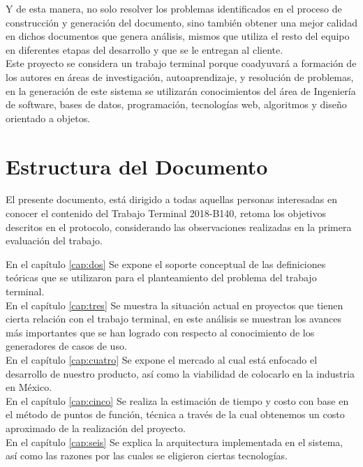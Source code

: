 Y de esta manera, no solo resolver los problemas identificados en el proceso de construcción y generación del documento, sino también obtener una mejor calidad en dichos documentos que genera análisis, mismos que utiliza el resto del equipo en diferentes etapas del desarrollo y que se le entregan al cliente.\\

Este proyecto se considera un trabajo terminal porque coadyuvará a formación de los autores en áreas de investigación, autoaprendizaje, y resolución de problemas, en la generación de este sistema se utilizarán conocimientos del área de Ingeniería de software, bases de datos, programación, tecnologías web, algoritmos y diseño orientado a objetos.

\section{Estructura del Documento}

El presente documento, está dirigido a todas aquellas personas interesadas en conocer el contenido del Trabajo Terminal 2018-B140, retoma los objetivos descritos en el protocolo, considerando las observaciones realizadas en la primera evaluación del trabajo. 


En el capítulo  \ref{cap:dos} Se expone el soporte conceptual de las definiciones teóricas que se utilizaron para el planteamiento del problema del trabajo terminal. \\

En el capítulo  \ref{cap:tres} Se muestra la situación actual en proyectos que tienen cierta relación con el trabajo terminal, en este análisis se muestran los avances más importantes que se han logrado con respecto al conocimiento de los generadores de casos de uso.\\

En el capítulo  \ref{cap:cuatro} Se expone el mercado al cual está enfocado el desarrollo de nuestro producto, así como la viabilidad de colocarlo en la industria en México.\\

En el capítulo  \ref{cap:cinco} Se realiza la estimación de tiempo y costo con base en el método de puntos de función, técnica a través de la cual obtenemos un costo aproximado de la realización del proyecto.\\

En el capítulo  \ref{cap:seis} Se explica la arquitectura implementada en el sistema, así como las razones por las cuales se eligieron ciertas tecnologías.\\

